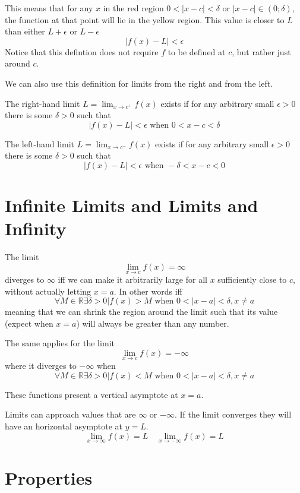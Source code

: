 \documentclass{article}
\begin{document}
This means that for any \(x\) in the red region \(0<|x-c|<\delta\text{ or }|x-c|\in (0; \delta)\),
the function at that point will lie in the yellow region.
This value is closer to \(L\) than either \(L + \epsilon\) or \(L - \epsilon\)
\[
    |f(x) - L| < \epsilon
\]
Notice that this defintion does not require \(f\) to be defined at \(c\), but rather just around \(c\).

We can also use this definition for limits from the right and from the left.

The right-hand limit \(L=\lim_{x\to c^{+}}f(x)\) exists if for any arbitrary small \(\epsilon > 0\)
there is some \(\delta > 0\) such that
\[
    |f(x)-L|<\epsilon \text{ when } 0 < x-c < \delta
\]

The left-hand limit \(L=\lim_{x\to c^{-}}f(x)\) exists if for any arbitrary small \(\epsilon > 0\)
there is some \(\delta > 0\) such that
\[
    |f(x)-L|<\epsilon \text{ when } -\delta < x-c < 0
\]

\pagebreak

\section{Infinite Limits and Limits and Infinity}

The limit
\[
    \lim_{x\to c}f(x) = \infty
\]
diverges to \(\infty\) iff we can make it arbitrarily large for all \(x\)
sufficiently close to \(c\), without actually letting \(x=a\).
In other words iff
\[
    \forall M \in \mathbb{R} \exists \delta > 0 | f(x) > M \text{ when } 0<|x-a|<\delta, x \neq a
\]
meaning that we can shrink the region around the limit such that its value (expect when \(x=a\))
will always be greater than any number.

The same applies for the limit
\[
    \lim_{x\to c}f(x) = -\infty
\]
where it diverges to \(-\infty\) when
\[
    \forall M \in \mathbb{R} \exists \delta > 0 | f(x) < M \text{ when } 0<|x-a|<\delta, x \neq a
\]

These functions present a vertical asymptote at \(x=a\).

Limits can approach values that are \(\infty\) or \(-\infty\).
If the limit converges they will have an horizontal asymptote at \(y=L\).
\[
    \lim_{x \to \infty} f(x) = L
    \quad
    \lim_{x \to -\infty} f(x) = L
\]

\section{Properties}
\end{document}

